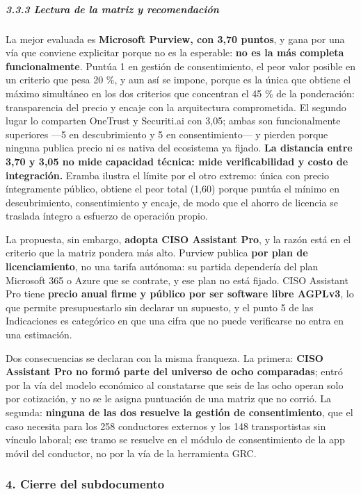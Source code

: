 \subparagraph{3.3.3 Lectura de la matriz y recomendación}\label{lectura-de-la-matriz-y-recomendaciuxf3n}

La mejor evaluada es \textbf{Microsoft Purview, con 3,70 puntos}, y gana por una vía que conviene explicitar porque no es la esperable: \textbf{no es la más completa funcionalmente}. Puntúa 1 en gestión de consentimiento, el peor valor posible en un criterio que pesa 20 \%, y aun así se impone, porque es la única que obtiene el máximo simultáneo en los dos criterios que concentran el 45 \% de la ponderación: transparencia del precio y encaje con la arquitectura comprometida. El segundo lugar lo comparten OneTrust y Securiti.ai con 3,05; ambas son funcionalmente superiores ---5 en descubrimiento y 5 en consentimiento--- y pierden porque ninguna publica precio ni es nativa del ecosistema ya fijado. \textbf{La distancia entre 3,70 y 3,05 no mide capacidad técnica: mide verificabilidad y costo de integración.} Eramba ilustra el límite por el otro extremo: única con precio íntegramente público, obtiene el peor total (1,60) porque puntúa el mínimo en descubrimiento, consentimiento y encaje, de modo que el ahorro de licencia se traslada íntegro a esfuerzo de operación propio.

La propuesta, sin embargo, \textbf{adopta CISO Assistant Pro}, y la razón está en el criterio que la matriz pondera más alto. Purview publica \textbf{por plan de licenciamiento}, no una tarifa autónoma: su partida dependería del plan Microsoft 365 o Azure que se contrate, y ese plan no está fijado. CISO Assistant Pro tiene \textbf{precio anual firme y público por ser software libre AGPLv3}, lo que permite presupuestarlo sin declarar un supuesto, y el punto 5 de las Indicaciones es categórico en que una cifra que no puede verificarse no entra en una estimación.

Dos consecuencias se declaran con la misma franqueza. La primera: \textbf{CISO Assistant Pro no formó parte del universo de ocho comparadas}; entró por la vía del modelo económico al constatarse que seis de las ocho operan solo por cotización, y no se le asigna puntuación de una matriz que no corrió. La segunda: \textbf{ninguna de las dos resuelve la gestión de consentimiento}, que el caso necesita para los 258 conductores externos y los 148 transportistas sin vínculo laboral; ese tramo se resuelve en el módulo de consentimiento de la app móvil del conductor, no por la vía de la herramienta GRC.

\subsubsection{4. Cierre del subdocumento}\label{cierre-del-subdocumento}

